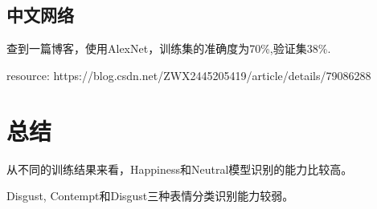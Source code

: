 \documentclass[11pt, a4paper]{article}
\begin{document}
\begin{CJK}{UTF8}{gbsn}
\subsection{中文网络}
查到一篇博客，使用AlexNet，训练集的准确度为70\%,验证集38\%.

resource:
https://blog.csdn.net/ZWX2445205419/article/details/79086288

\section{总结}

从不同的训练结果来看，Happiness和Neutral模型识别的能力比较高。

Disgust, Contempt和Disgust三种表情分类识别能力较弱。
\end{CJK}









  
% 





\end{document}
